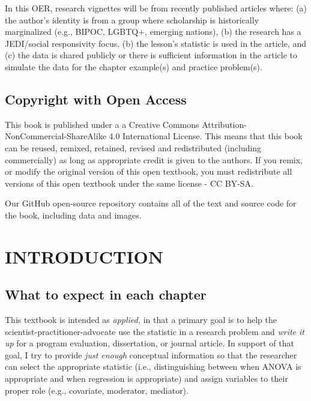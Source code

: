 \documentclass[
  english,
]{book}
\begin{document}
In this OER, research vignettes will be from recently published articles where: (a) the author's identity is from a group where scholarship is historically marginalized (e.g., BIPOC, LGBTQ+, emerging nations), (b) the research has a JEDI/social responsivity focus, (b) the lesson's statistic is used in the article, and (c) the data is shared publicly or there is sufficient information in the article to simulate the data for the chapter example(s) and practice problem(s).

\hypertarget{copyright-with-open-access}{%
\section*{Copyright with Open Access}\label{copyright-with-open-access}}

This book is published under a a Creative Commons Attribution-NonCommercial-ShareAlike 4.0 International License. This means that this book can be reused, remixed, retained, revised and redistributed (including commercially) as long as appropriate credit is given to the authors. If you remix, or modify the original version of this open textbook, you must redistribute all versions of this open textbook under the same license - CC BY-SA.

Our GitHub open-source repository contains all of the text and source code for the book, including data and images.

\hypertarget{ReCintro}{%
\chapter{INTRODUCTION}\label{ReCintro}}

\hypertarget{what-to-expect-in-each-chapter}{%
\section{What to expect in each chapter}\label{what-to-expect-in-each-chapter}}

This textbook is intended as \emph{applied,} in that a primary goal is to help the scientist-practitioner-advocate use the statistic in a research problem and \emph{write it up} for a program evaluation, dissertation, or journal article. In support of that goal, I try to provide \emph{just enough} conceptual information so that the researcher can select the appropriate statistic (i.e., distinguishing between when ANOVA is appropriate and when regression is appropriate) and assign variables to their proper role (e.g., covariate, moderator, mediator).
\end{document}
